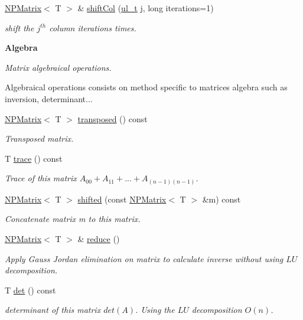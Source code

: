 \begin{Indent}
\begin{DoxyCompactItemize}
\mbox{\hyperlink{class_n_p_matrix}{N\+P\+Matrix}}$<$ T $>$ \& \mbox{\hyperlink{class_n_p_matrix_ae039695bf1464be6563f81d6e0c502d8}{shift\+Col}} (\mbox{\hyperlink{group___n_algebra_ga1b140a2034db3f5dfe18a987745df43a}{ul\+\_\+t}} j, long iterations=1)
\begin{DoxyCompactList}\small\item\em shift the $ j^{th} $ column {\ttfamily iterations} times. \end{DoxyCompactList}\end{DoxyCompactItemize}
\end{Indent}
\begin{Indent}\textbf{ Algebra}\par
{\em Matrix algebraical operations.

Algebraical operations consists on method specific to matrices algebra such as inversion, determinant... }\begin{DoxyCompactItemize}
\item 
\mbox{\hyperlink{class_n_p_matrix}{N\+P\+Matrix}}$<$ T $>$ \mbox{\hyperlink{class_n_p_matrix_abb4f410d97dc7e89798c67112c1e1bd3}{transposed}} () const
\begin{DoxyCompactList}\small\item\em Transposed matrix. \end{DoxyCompactList}\item 
T \mbox{\hyperlink{class_n_p_matrix_a007a87743223b6dddaa3ec8e44489ffb}{trace}} () const
\begin{DoxyCompactList}\small\item\em Trace of this matrix $ A_{00} + A_{11} + ... + A_{(n-1)(n-1)} $. \end{DoxyCompactList}\item 
\mbox{\hyperlink{class_n_p_matrix}{N\+P\+Matrix}}$<$ T $>$ \mbox{\hyperlink{class_n_p_matrix_ac46001932fe08670105f2b51dc72c32b}{shifted}} (const \mbox{\hyperlink{class_n_p_matrix}{N\+P\+Matrix}}$<$ T $>$ \&m) const
\begin{DoxyCompactList}\small\item\em Concatenate matrix {\ttfamily m} to {\ttfamily this} matrix. \end{DoxyCompactList}\item 
\mbox{\hyperlink{class_n_p_matrix}{N\+P\+Matrix}}$<$ T $>$ \& \mbox{\hyperlink{class_n_p_matrix_ae9789161bbe6c4dc9be0bd8908313a29}{reduce}} ()
\begin{DoxyCompactList}\small\item\em Apply Gauss Jordan elimination on matrix to calculate inverse without using $ LU $ decomposition. \end{DoxyCompactList}\item 
T \mbox{\hyperlink{class_n_p_matrix_afea28129e85911922957e9013d81e79a}{det}} () const
\begin{DoxyCompactList}\small\item\em determinant of this matrix $ det(A) $. Using the $ LU $ decomposition $ O(n) $. \end{DoxyCompactList}\end{DoxyCompactItemize}
\end{Indent}
